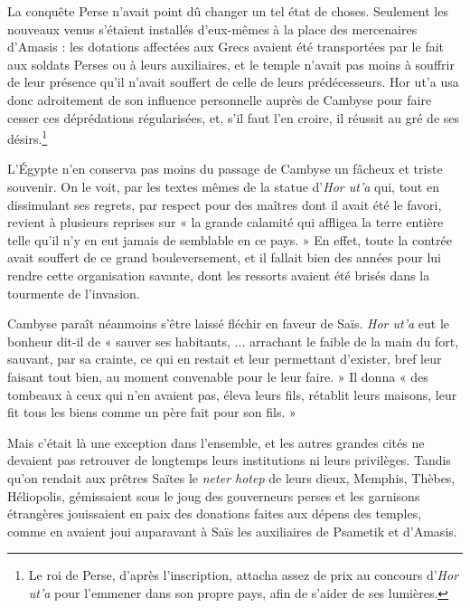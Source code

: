 \documentclass[a4paper, 11pt, oneside]{article}
\begin{document}
La conquête Perse n'avait point dû changer un tel état de choses. Seulement les nouveaux venus s'étaient installés d'eux-mêmes à la place des mercenaires d'Amasis : les dotations affectées aux Grecs avaient été transportées par le fait aux soldats Perses ou à leurs auxiliaires, et le temple n'avait pas moins à souffrir de leur présence qu'il n'avait souffert de celle de leurs prédécesseurs. Hor ut'a usa donc adroitement de son influence personnelle auprès de Cambyse pour faire cesser ces déprédations régularisées, et, s'il faut l'en croire, il réussit au gré de ses désirs.\footnote{Le roi de Perse, d'après l'inscription, attacha assez de prix au concours d'\emph{Hor ut'a} pour l'emmener dans son propre pays, afin de s'aider de ses lumières.}

L'Égypte n'en conserva pas moins du passage de Cambyse un fâcheux et triste souvenir. On le voit, par les textes mêmes de la statue d'\emph{Hor ut'a} qui, tout en dissimulant ses regrets, par respect pour des maîtres dont il avait été le favori, revient à plusieurs reprises sur « la grande calamité qui affligea la terre entière telle qu'il n'y en eut jamais de semblable en ce pays. » En effet, toute la contrée avait souffert de ce grand bouleversement, et il fallait bien des années pour lui rendre cette organisation savante, dont les ressorts avaient été brisés dans la tourmente de l'invasion.

Cambyse paraît néanmoins s'être laissé fléchir en faveur de Saïs. \emph{Hor ut'a} eut le bonheur dit-il de « sauver ses habitants, ... arrachant le faible de la main du fort, sauvant, par sa crainte, ce qui en restait et leur permettant d'exister, bref leur faisant tout bien, au moment convenable pour le leur faire. » Il donna « des tombeaux à ceux qui n'en avaient pas, éleva leurs fils, rétablit leurs maisons, leur fit tous les biens comme un père fait pour son fils. »

Mais c'était là une exception dans l'ensemble, et les autres grandes cités ne devaient pas retrouver de longtemps leurs institutions ni leurs privilèges. Tandis qu'on rendait aux prêtres Saïtes le \emph{neter hotep} de leurs dieux, Memphis, Thèbes, Héliopolis, gémissaient sous le joug des gouverneurs perses et les garnisons étrangères jouissaient en paix des donations faites aux dépens des temples, comme en avaient joui auparavant à Saïs les auxiliaires de Psametik et d'Amasis.
\end{document}
